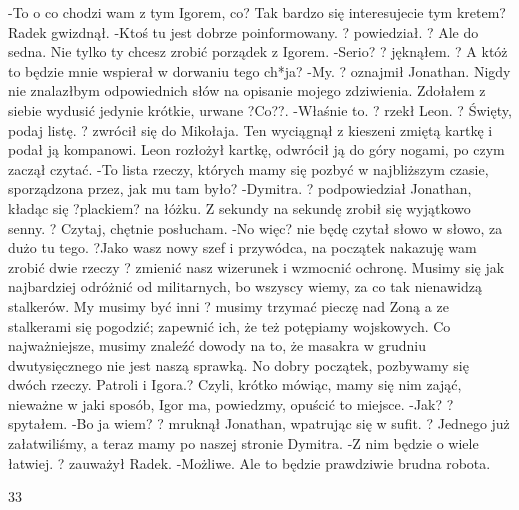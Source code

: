 \documentclass[../MAIN.tex]{subfiles}
\begin{document}
-To o co chodzi wam z tym Igorem, co? Tak bardzo się interesujecie tym kretem?
Radek gwizdnął.
-Ktoś tu jest dobrze poinformowany. ? powiedział. ? Ale do sedna. Nie tylko ty chcesz zrobić porządek z Igorem.
-Serio? ? jęknąłem. ? A któż to będzie mnie wspierał w dorwaniu tego ch*ja?
-My. ? oznajmił Jonathan.
Nigdy nie znalazłbym odpowiednich słów na opisanie mojego zdziwienia. Zdołałem z siebie wydusić jedynie krótkie, urwane ?Co??.
-Właśnie to. ? rzekł Leon. ? Święty, podaj listę. ? zwrócił się do Mikołaja. Ten wyciągnął z kieszeni zmiętą kartkę i podał ją kompanowi.
Leon rozłożył kartkę, odwrócił ją do góry nogami, po czym zaczął czytać.
-To lista rzeczy, których mamy się pozbyć w najbliższym czasie, sporządzona przez, jak mu tam było?
-Dymitra. ? podpowiedział Jonathan, kładąc się ?plackiem? na łóżku. Z sekundy na sekundę zrobił się wyjątkowo senny. ? Czytaj, chętnie posłucham.
-No więc? nie będę czytał słowo w słowo, za dużo tu tego. ?Jako wasz nowy szef i przywódca, na początek nakazuję wam zrobić dwie rzeczy ? zmienić nasz wizerunek i wzmocnić ochronę. Musimy się jak najbardziej odróżnić od militarnych, bo wszyscy wiemy, za co tak nienawidzą stalkerów. My musimy być inni ? musimy trzymać pieczę nad Zoną a ze stalkerami się pogodzić; zapewnić ich, że też potępiamy wojskowych. Co najważniejsze, musimy znaleźć dowody na to, że masakra w grudniu dwutysięcznego nie jest naszą sprawką. No dobry początek, pozbywamy się dwóch rzeczy. Patroli i Igora.?
Czyli, krótko mówiąc, mamy się nim zająć, nieważne w jaki sposób, Igor ma, powiedzmy, opuścić to miejsce.
-Jak? ? spytałem.
-Bo ja wiem? ? mruknął Jonathan, wpatrując się w sufit. ? Jednego już załatwiliśmy, a teraz mamy po naszej stronie Dymitra.
-Z nim będzie o wiele łatwiej. ? zauważył Radek.
-Możliwe. Ale to będzie prawdziwie brudna robota.

33
\end{document}
